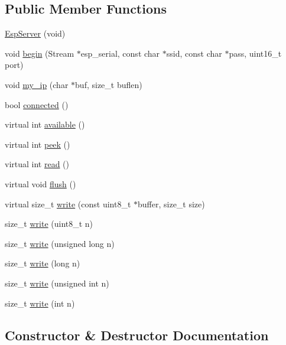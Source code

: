 \subsection*{Public Member Functions}
\begin{DoxyCompactItemize}
\item 
\mbox{\hyperlink{class_esp_server_aa852bdd3db81410e2b71cafa8adb5c79}{Esp\+Server}} (void)
\item 
void \mbox{\hyperlink{class_esp_server_a1d8682ca0934af03639311e23a71283f}{begin}} (Stream $\ast$esp\+\_\+serial, const char $\ast$ssid, const char $\ast$pass, uint16\+\_\+t port)
\item 
void \mbox{\hyperlink{class_esp_server_a01953c4cc039c37f94dc3e1057126abb}{my\+\_\+ip}} (char $\ast$buf, size\+\_\+t buflen)
\item 
bool \mbox{\hyperlink{class_esp_server_a59fc494d53391b27e2fd75cb750690d9}{connected}} ()
\item 
virtual int \mbox{\hyperlink{class_esp_server_a4549a76725f2e4c013e4d57018366109}{available}} ()
\item 
virtual int \mbox{\hyperlink{class_esp_server_a9040fa1d479d71edf3a826f4691c35c4}{peek}} ()
\item 
virtual int \mbox{\hyperlink{class_esp_server_aaab5dab5b969a87f538242e524431637}{read}} ()
\item 
virtual void \mbox{\hyperlink{class_esp_server_adac116554b543b7c4228c018a85882f5}{flush}} ()
\item 
virtual size\+\_\+t \mbox{\hyperlink{class_esp_server_a7c66fc8d559f4956d4ccea196299bca7}{write}} (const uint8\+\_\+t $\ast$buffer, size\+\_\+t size)
\item 
size\+\_\+t \mbox{\hyperlink{class_esp_server_af32c245c813bbadb566538bba418b0fe}{write}} (uint8\+\_\+t n)
\item 
size\+\_\+t \mbox{\hyperlink{class_esp_server_a0ba52a995edf9b6c2cdf3d396be84ff1}{write}} (unsigned long n)
\item 
size\+\_\+t \mbox{\hyperlink{class_esp_server_a3cfec102ee6f58a2f7e617999ce9f5bb}{write}} (long n)
\item 
size\+\_\+t \mbox{\hyperlink{class_esp_server_a2d9bc6ac05e45a7023be3cd1ca224407}{write}} (unsigned int n)
\item 
size\+\_\+t \mbox{\hyperlink{class_esp_server_a22e7ab55e0aa268cff5b48e763429ec3}{write}} (int n)
\end{DoxyCompactItemize}


\subsection{Constructor \& Destructor Documentation}
\mbox{\label{class_esp_server_aa852bdd3db81410e2b71cafa8adb5c79}} 
